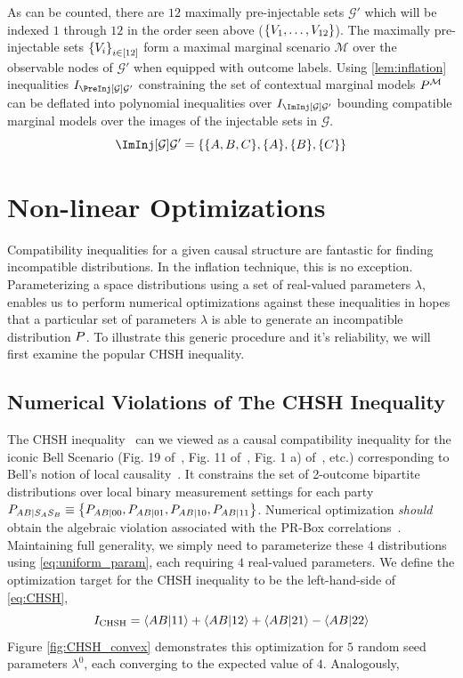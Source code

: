\documentclass[aps, 10pt, english, twoside, pra, nofootinbib, longbibliography]{revtex4-1}
\theoremstyle{plain}
\theoremstyle{definition}
\theoremstyle{remark}
\newcommand{\graph}{\mathcal{G}}
\newcommand{\mscenario}{\mathcal{M}}
\newcommand{\ts}{{\graph}}
\begin{document}
    As can be counted, there are $12$ maximally pre-injectable sets $\ts'$ which will be indexed $1$ through $12$ in the order seen above ($\bc{V_1, \ldots, V_{12}}$). The maximally pre-injectable sets $\bc{V_i}_{i \in \bs{12}}$ form a maximal marginal scenario $\mscenario$ over the observable nodes of $\ts'$ when equipped with outcome labels. Using \cref{lem:inflation} inequalities $I_{\PreInj[\ts]{\ts'}}$ constraining the set of contextual marginal models $\prob^{\mscenario}$ can be deflated into polynomial inequalities over $I_{\ImInj[\ts]{\ts'}}$ bounding compatible marginal models over the images of the injectable sets in $\ts$.
    \[ \ImInj[\ts]{\ts'} = \bc{\bc{A, B, C}, \bc{A}, \bc{B}, \bc{C}} \]


    \section{Non-linear Optimizations}
    \label{sec:optimizations}
    Compatibility inequalities for a given causal structure are fantastic for finding incompatible distributions. In the inflation technique, this is no exception. Parameterizing a space distributions using a set of real-valued parameters $\lambda$, enables us to perform numerical optimizations against these inequalities in hopes that a particular set of parameters $\lambda$ is able to generate an incompatible distribution $\prob$. To illustrate this generic procedure and it's reliability, we will first examine the popular CHSH inequality.
    \subsection{Numerical Violations of The CHSH Inequality}
    The CHSH inequality~\cite{CHSH_Original} can we viewed as a causal compatibility inequality for the iconic Bell Scenario (Fig. 19 of~\cite{Wood_2012}, Fig. 11 of~\cite{Inflation}, Fig. 1 a) of~\cite{Tavakoli_2015}, etc.) corresponding to Bell's notion of local causality~\cite{Wood_2012}. It constrains the set of 2-outcome bipartite distributions over local binary measurement settings for each party $\prob[AB\mid S_A S_B] \defined \bc{\prob[AB\mid 0 0], \prob[AB\mid 01], \prob[AB\mid 10], \prob[AB\mid 11]}$. Numerical optimization \textit{should} obtain the algebraic violation associated with the PR-Box correlations~\cite{PR_1995}. Maintaining full generality, we simply need to parameterize these $4$ distributions using \cref{eq:uniform_param}, each requiring $4$ real-valued parameters. We define the optimization target for the CHSH inequality to be the left-hand-side of \cref{eq:CHSH},
    \[ I\tsb{CHSH} = \ba{AB|11} + \ba{AB|12} + \ba{AB|21} - \ba{AB|22} \]
    Figure \ref{fig:CHSH_convex} demonstrates this optimization for $5$ random seed parameters $\lambda^0$, each converging to the expected value of $4$. Analogously,~\cite{Cirelson_1980}
\end{document}
